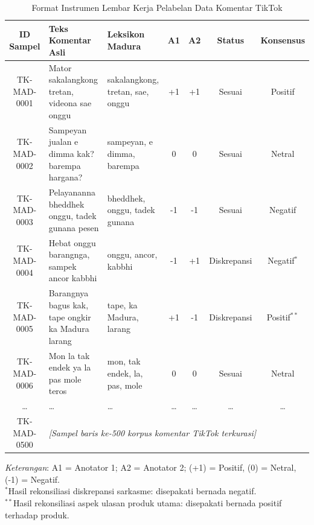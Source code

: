 \begin{table}[H]
\centering
\footnotesize
\setlength{\tabcolsep}{2.5pt}
\renewcommand{\arraystretch}{1.25}
\begin{tabular}{|c|p{3.9cm}|p{2.2cm}|c|c|c|c|}
\hline
\rowcolor{gray!20}
\textbf{ID Sampel} & \textbf{Teks Komentar Asli} & \textbf{Leksikon Madura} & \textbf{A1} & \textbf{A2} & \textbf{Status} & \textbf{Konsensus} \\
\hline
TK-MAD-0001 & Mator sakalangkong tretan, videona sae onggu & sakalangkong, tretan, sae, onggu & +1 & +1 & Sesuai & Positif \\
\hline
TK-MAD-0002 & Sampeyan jualan e dimma kak? barempa hargana? & sampeyan, e dimma, barempa & 0 & 0 & Sesuai & Netral \\
\hline
TK-MAD-0003 & Pelayananna bheddhek onggu, tadek gunana pesen & bheddhek, onggu, tadek gunana & -1 & -1 & Sesuai & Negatif \\
\hline
TK-MAD-0004 & Hebat onggu barangnga, sampek ancor kabbhi & onggu, ancor, kabbhi & -1 & +1 & Diskrepansi & Negatif$^*$ \\
\hline
TK-MAD-0005 & Barangnya bagus kak, tape ongkir ka Madura larang & tape, ka Madura, larang & +1 & -1 & Diskrepansi & Positif$^{**}$ \\
\hline
TK-MAD-0006 & Mon la tak endek ya la pas mole teros & mon, tak endek, la, pas, mole & 0 & 0 & Sesuai & Netral \\
\hline
\dots & \dots & \dots & \dots & \dots & \dots & \dots \\
\hline
TK-MAD-0500 & \multicolumn{6}{l|}{\textit{[Sampel baris ke-500 korpus komentar TikTok terkurasi]}} \\
\hline
\end{tabular}
\vspace{0.1cm}
\begin{flushleft}
\footnotesize
\textit{Keterangan}: A1 = Anotator 1; A2 = Anotator 2; (+1) = Positif, (0) = Netral, (-1) = Negatif.\\
$^*$Hasil rekonsiliasi diskrepansi sarkasme: disepakati bernada negatif.\\
$^{**}$Hasil rekonsiliasi aspek ulasan produk utama: disepakati bernada positif terhadap produk.\\
\end{flushleft}
\caption{Format Instrumen Lembar Kerja Pelabelan Data Komentar TikTok}
\label{tab:format_lembar_anotasi}
\end{table}

\newpage

